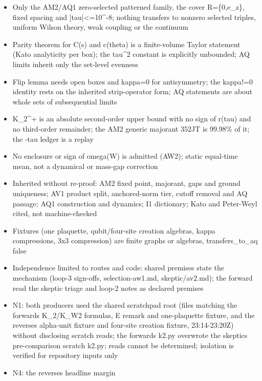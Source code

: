 \begin{gatequote}
\begin{itemize}
\item Only the AM2/AQ1 zero-selected patterned family, the cover R=\{0,e\_z\},
fixed spacing and |tau|<=10\textasciicircum{}-8; nothing transfers to nonzero
selected triples, uniform Wilson theory, weak coupling or the continuum
\item Parity theorem for C(s) and c(theta) is a finite-volume Taylor statement
(Kato analyticity per box); the tau\textasciicircum{}2 constant is explicitly
unbounded; AQ limits inherit only the set-level evenness
\item Flip lemma needs open boxes and kappa=0 for antisymmetry; the kappa!=0
identity rests on the inherited strip-operator form; AQ statements are about
whole sets of subsequential limits
\item K\_2\textasciicircum{}+ is an absolute second-order upper bound with no
sign of r(tau) and no third-order remainder; the AM2 generic majorant 352JT is
99.98\% of it; the -tau ledger is a replay
\item No enclosure or sign of omega(W) is admitted (AW2); static equal-time
mean, not a dynamical or mass-gap correction
\item Inherited without re-proof: AM2 fixed point, majorant, gaps and ground
uniqueness; AV1 product split, anchored-norm tier, cutoff removal and AQ
passage; AQ1 construction and dynamics; I1 dictionary; Kato and Peter-Weyl
cited, not machine-checked
\item Fixtures (one plaquette, qubit/four-site creation algebras, kappa
compressions, 3x3 compression) are finite graphs or algebras,
transfers\_to\_aq false
\item Independence limited to routes and code: shared premises state the
mechanism (loop-3 sign-offs, selection-aw1.md, skeptic/av2.md); the forward
read the skeptic triage and loop-2 notes as declared premises
\item N1: both producers used the shared scratchpad root (files matching the
forward\textquotesingle{}s K\_2/K\_W2 formulas,
E\textquotesingle{}\textquotesingle{} remark and one-plaquette fixture, and
the reverse\textquotesingle{}s alpha-unit fixture and four-site creation
fixture, 23:14-23:20Z) without disclosing scratch reads; the
forward\textquotesingle{}s k2.py overwrote the skeptic\textquotesingle{}s
pre-comparison scratch k2.py; reads cannot be determined; isolation is
verified for repository inputs only
\item N4: the reverse\textquotesingle{}s headline \textquotesingle{}margin

\end{itemize}
\end{gatequote}
